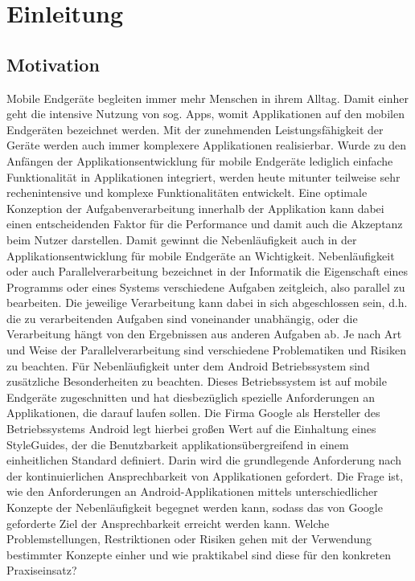 \documentclass[12pt,oneside,a4paper,bibtotoc,liststotoc]{scrreprt}
\begin{document}
\tableofcontents
\listoffigures


\chapter{Einleitung}
\section{Motivation}
Mobile Endgeräte begleiten immer mehr Menschen in ihrem Alltag. Damit einher geht die intensive Nutzung von sog. Apps, womit Applikationen auf den mobilen Endgeräten bezeichnet werden. Mit der zunehmenden Leistungsfähigkeit der Geräte werden auch immer komplexere Applikationen realisierbar. Wurde zu den Anfängen der Applikationsentwicklung für mobile Endgeräte lediglich einfache Funktionalität in Applikationen integriert, werden heute mitunter teilweise sehr rechenintensive und komplexe Funktionalitäten entwickelt. Eine optimale Konzeption der Aufgabenverarbeitung innerhalb der Applikation kann dabei einen entscheidenden Faktor für die Performance und damit auch die Akzeptanz beim Nutzer darstellen. Damit gewinnt die Nebenläufigkeit auch in der Applikationsentwicklung für mobile Endgeräte an Wichtigkeit. Nebenläufigkeit oder auch Parallelverarbeitung bezeichnet in der Informatik die Eigenschaft eines Programms oder eines Systems verschiedene Aufgaben zeitgleich, also parallel zu bearbeiten. Die jeweilige Verarbeitung kann dabei in sich abgeschlossen sein, d.h. die zu verarbeitenden Aufgaben sind voneinander unabhängig, oder die Verarbeitung hängt von den Ergebnissen aus anderen Aufgaben ab. Je nach Art und Weise der Parallelverarbeitung sind verschiedene Problematiken und Risiken zu beachten. Für Nebenläufigkeit unter dem Android Betriebssystem sind zusätzliche Besonderheiten zu beachten. Dieses Betriebssystem ist auf mobile Endgeräte zugeschnitten und hat diesbezüglich spezielle Anforderungen an Applikationen, die darauf laufen sollen. Die Firma Google als Hersteller des Betriebssystems Android legt hierbei großen Wert auf die Einhaltung eines StyleGuides, der die Benutzbarkeit applikationsübergreifend in einem einheitlichen Standard definiert. Darin wird die grundlegende Anforderung nach der kontinuierlichen Ansprechbarkeit von Applikationen gefordert. Die Frage ist, wie den Anforderungen an Android-Applikationen mittels unterschiedlicher Konzepte der Nebenläufigkeit begegnet werden kann, sodass das von Google geforderte Ziel der Ansprechbarkeit erreicht werden kann. Welche Problemstellungen, Restriktionen oder Risiken gehen mit der Verwendung bestimmter Konzepte einher und wie praktikabel sind diese für den konkreten Praxiseinsatz? 
\end{document}
